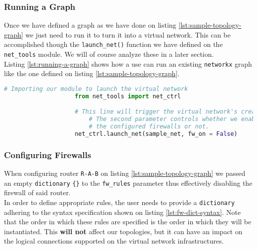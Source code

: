             \subsubsection{Running a Graph}
                Once we have defined a graph as we have done on listing \ref{lst:sample-topology-graph} we just need to run it to turn it into a virtual network. This can be accomplished though the \texttt{launch\_net()} function we have defined on the \texttt{net\_tools} module. We will of course analyze these in a later section.\\

                Listing \ref{lst:running-a-graph} shows how a use can run an existing \texttt{networkx} graph like the one defined on listing \ref{lst:sample-topology-graph}.\\

                \begin{lstlisting}[language = python, caption = Turning a graph into a virtual network., label = lst:running-a-graph]
                    # Importing our module to launch the virtual network
                    from net_tools import net_ctrl

                    # This line will trigger the virtual network's creation.
                        # The second parameter controls whether we enable
                        # the configured firewalls or not.
                    net_ctrl.launch_net(sample_net, fw_on = False)
                \end{lstlisting}

            \subsubsection{Configuring Firewalls} \label{sec:fw-rules}
                When configuring router \texttt{R-A-B} on listing \ref{lst:sample-topology-graph} we passed an empty \texttt{dictionary} \texttt{\{\}} to the \texttt{fw\_rules} parameter thus effectively disabling the firewall of said router.\\

                In order to define appropriate rules, the user needs to provide a \texttt{dictionary} adhering to the syntax specification shown on listing \ref{lst:fw-dict-syntax}. Note that the order in which these rules are specified is the order in which they will be instantiated. This \textbf{will not} affect our topologies, but it can have an impact on the logical connections supported on the virtual network infrastructures.\\

